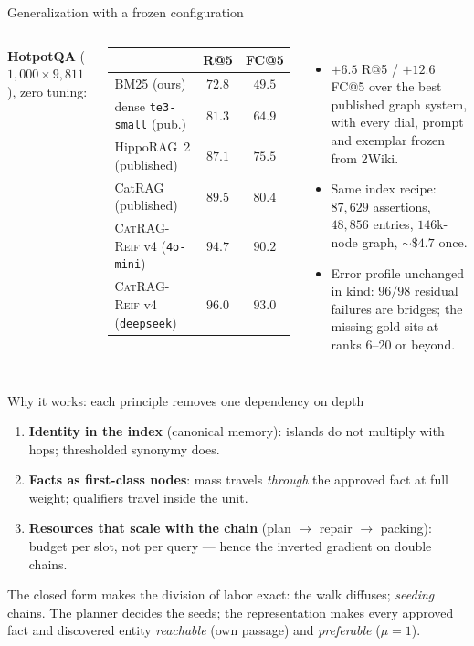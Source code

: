 \documentclass[aspectratio=169,10pt]{beamer}
\newcommand{\sys}{\textsc{CatRAG-Reif}}
\newcommand{\hippo}{HippoRAG~2}
\begin{document}
\begin{frame}{Generalization with a frozen configuration}
\begin{columns}[T]
\textbf{HotpotQA} ($1{,}000\times9{,}811$), zero tuning:
\begin{center}\small
\begin{tabular}{lcc}
\toprule
 & R@5 & FC@5\\
\midrule
BM25 (ours) & $72.8$ & $49.5$\\
dense \texttt{te3-small} (pub.) & $81.3$ & $64.9$\\
\hippo{} (published) & $87.1$ & $75.5$\\
CatRAG (published) & $89.5$ & $80.4$\\
\sys{} v4 (\texttt{4o-mini}) & $94.7$ & $90.2$\\
\sys{} v4 (\texttt{deepseek}) & $\mathbf{96.0}$ & $\mathbf{93.0}$\\
\bottomrule
\end{tabular}
\end{center}
\footnotesize
\begin{itemize}\footnotesize
\item $+6.5$ R@5 / $+12.6$ FC@5 over the best published graph system,
  with every dial, prompt and exemplar frozen from 2Wiki.
\item Same index recipe: $87{,}629$ assertions, $48{,}856$ entries,
  $146$k-node graph, ${\sim}\$4.7$ once.
\item Error profile unchanged in kind: $96/98$ residual failures are
  bridges; the missing gold sits at ranks 6--20 or beyond.
\end{itemize}
\end{columns}
\end{frame}

\begin{frame}{Why it works: each principle removes one dependency on depth}
\begin{enumerate}
\item \textbf{Identity in the index} (canonical memory): islands do not
  multiply with hops; thresholded synonymy does.
\item \textbf{Facts as first-class nodes}: mass travels \emph{through} the
  approved fact at full weight; qualifiers travel inside the unit.
\item \textbf{Resources that scale with the chain} (plan $\to$ repair $\to$
  packing): budget per slot, not per query --- hence the inverted gradient
  on double chains.
\end{enumerate}
\vspace{1mm}
\footnotesize The closed form makes the division of labor exact: the walk
diffuses; \emph{seeding} chains. The planner decides the seeds; the
representation makes every approved fact and discovered entity
\emph{reachable} (own passage) and \emph{preferable} ($\mu=1$).
\end{frame}
\end{document}
